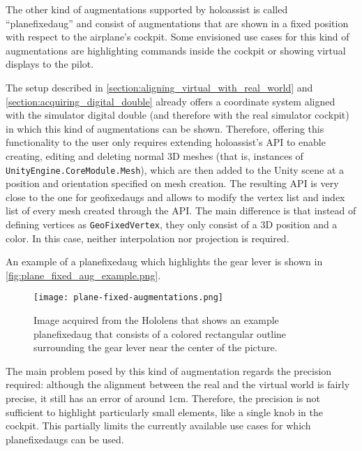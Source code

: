 The other kind of augmentations supported by \gls{holoassist} is called \enquote{\gls{planefixedaug}} and consist of augmentations that are shown in a fixed position with respect to the airplane's cockpit. Some envisioned use cases for this kind of augmentations are highlighting commands inside the cockpit or showing virtual displays to the pilot.

The setup described in \autoref{section:aligning_virtual_with_real_world} and \autoref{section:acquiring_digital_double} already offers a coordinate system aligned with the simulator digital double (and therefore with the real simulator cockpit) in which this kind of augmentations can be shown. Therefore, offering this functionality to the user only requires extending \gls{holoassist}'s \gls{API} to enable creating, editing and deleting normal 3D meshes (that is, instances of \texttt{UnityEngine.CoreModule.Mesh}), which are then added to the Unity scene at a position and orientation specified on mesh creation. The resulting \gls{API} is very close to the one for \glspl{geofixedaug} and allows to modify the vertex list and index list of every mesh created through the \gls{API}. The main difference is that instead of defining vertices as \texttt{GeoFixedVertex}, they only consist of a 3D position and a color. In this case, neither interpolation nor projection is required.

An example of a \gls{planefixedaug} which highlights the gear lever is shown in \autoref{fig:plane_fixed_aug_example.png}.

\begin{figure}
  \centering
  \texttt{[image: plane-fixed-augmentations.png]}
  \caption{Image acquired from the Hololens that shows an example \gls{planefixedaug} that consists of a colored rectangular outline surrounding the gear lever near the center of the picture.}\label{fig:plane_fixed_aug_example.png}
\end{figure}

The main problem posed by this kind of augmentation regards the precision required: although the alignment between the real and the virtual world is fairly precise, it still has an error of around $1$cm. Therefore, the precision is not sufficient to highlight particularly small elements, like a single knob in the cockpit. This partially limits the currently available use cases for which \glspl{planefixedaug} can be used.

